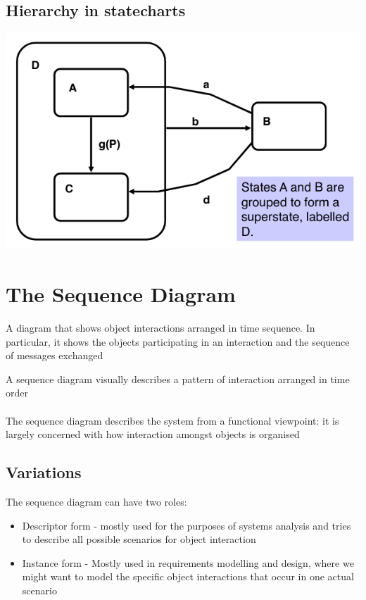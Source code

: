 \documentclass{article}[18pt]
\begin{document}
\subsection{Hierarchy in statecharts}
\begin{center}
	\includegraphics[scale=0.7]{statecharts}
\end{center}
\section{The Sequence Diagram}
\begin{defin}
	A diagram that shows object interactions arranged in time sequence. In particular, it shows the objects participating in an interaction and the sequence of messages exchanged
\end{defin}
A sequence diagram visually describes a pattern of interaction arranged in time order\\
\\
The sequence diagram describes the system from a functional viewpoint: it is largely concerned with how interaction amongst objects is organised
\subsection{Variations}
The sequence diagram can have two roles:
\begin{itemize}
	\item Descriptor form - mostly used for the purposes of systems analysis and tries to describe all possible scenarios for object interaction
	\item Instance form - Mostly used in requirements modelling and design, where we might want to model the specific object interactions that occur in one actual scenario
\end{itemize}
\end{document}
